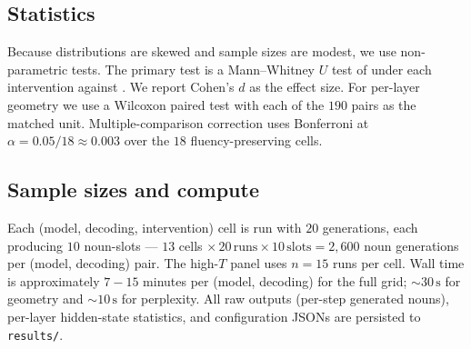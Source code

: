 \subsection{Statistics}
\label{sec:method:stats}

Because \dat distributions are skewed and sample sizes are modest, we use
non-parametric tests. The primary test is a Mann--Whitney $U$ test of \dat
under each intervention against \stockln. We report Cohen's $d$ as the
effect size. For per-layer geometry we use a Wilcoxon paired test with each
of the $190$ pairs as the matched unit. Multiple-comparison correction uses
Bonferroni at $\alpha{=}0.05/18{\approx}0.003$ over the $18$
fluency-preserving \nomean cells.

\subsection{Sample sizes and compute}
\label{sec:method:samples}

Each (model, decoding, intervention) cell is run with $20$ generations,
each producing $10$ noun-slots --- $13$ cells $\times\,20\,\text{runs}\times
10\,\text{slots}=2{,}600$ noun generations per (model, decoding) pair. The
high-$T$ panel uses $n{=}15$ runs per cell. Wall time is approximately
$7\!-\!15$ minutes per (model, decoding) for the full \dat grid;
$\sim\!30\,\text{s}$ for geometry and $\sim\!10\,\text{s}$ for perplexity.
All raw outputs (per-step generated nouns), per-layer hidden-state
statistics, and configuration JSONs are persisted to \texttt{results/}.
